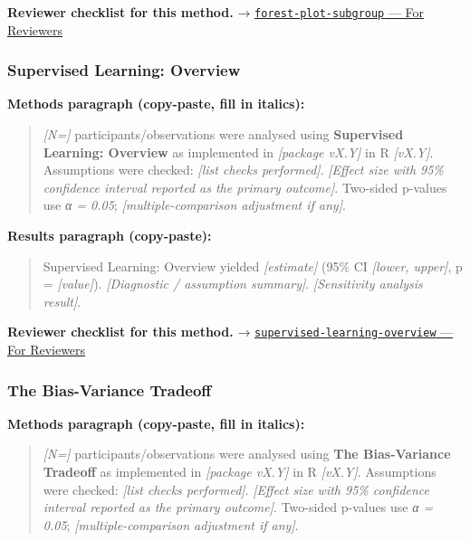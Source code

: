 \documentclass[
]{article}
\begin{document}
\textbf{Reviewer checklist for this method.} →
\href{../chapters/14-clinical/forest-plot-subgroup.Rmd\#for-reviewers}{\texttt{forest-plot-subgroup}
--- For Reviewers}

\subsubsection{Supervised Learning:
Overview}\label{supervised-learning-overview}

\textbf{Methods paragraph (copy-paste, fill in italics):}

\begin{quote}
\emph{{[}N={]}} participants/observations were analysed using
\textbf{Supervised Learning: Overview} as implemented in
\emph{{[}package vX.Y{]}} in R \emph{{[}vX.Y{]}}. Assumptions were
checked: \emph{{[}list checks performed{]}}. \emph{{[}Effect size with
95\% confidence interval reported as the primary outcome{]}}. Two-sided
p-values use \emph{α = 0.05}; \emph{{[}multiple-comparison adjustment if
any{]}}.
\end{quote}

\textbf{Results paragraph (copy-paste):}

\begin{quote}
Supervised Learning: Overview yielded \emph{{[}estimate{]}} (95\% CI
\emph{{[}lower, upper{]}}, p = \emph{{[}value{]}}). \emph{{[}Diagnostic
/ assumption summary{]}}. \emph{{[}Sensitivity analysis result{]}}.
\end{quote}

\textbf{Reviewer checklist for this method.} →
\href{../chapters/13-ml/supervised-learning-overview.Rmd\#for-reviewers}{\texttt{supervised-learning-overview}
--- For Reviewers}

\subsubsection{The Bias-Variance
Tradeoff}\label{the-bias-variance-tradeoff}

\textbf{Methods paragraph (copy-paste, fill in italics):}

\begin{quote}
\emph{{[}N={]}} participants/observations were analysed using
\textbf{The Bias-Variance Tradeoff} as implemented in \emph{{[}package
vX.Y{]}} in R \emph{{[}vX.Y{]}}. Assumptions were checked: \emph{{[}list
checks performed{]}}. \emph{{[}Effect size with 95\% confidence interval
reported as the primary outcome{]}}. Two-sided p-values use \emph{α =
0.05}; \emph{{[}multiple-comparison adjustment if any{]}}.
\end{quote}
\end{document}
